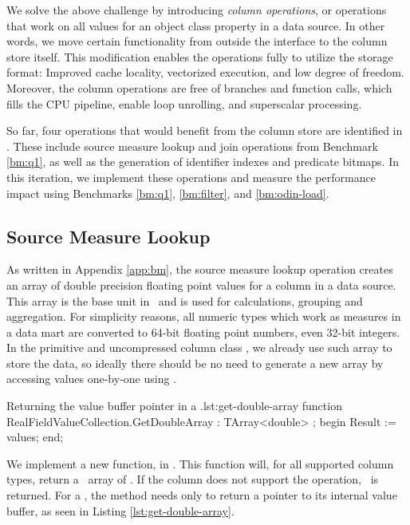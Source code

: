 We solve the above challenge by introducing \textit{column operations}, or operations that work on all values for an object class property in a data source. In other words, we move certain functionality from outside the  interface to the column store itself. This modification enables the operations fully to utilize the storage format: Improved cache locality, vectorized execution, and low degree of freedom. Moreover, the column operations are free of branches and function calls, which fills the CPU pipeline, enable loop unrolling, and superscalar processing.

So far, four operations that would benefit from the column store are identified in \gap. These include source measure lookup and join operations from Benchmark \ref{bm:q1}, as well as the generation of identifier indexes and predicate bitmaps. In this iteration, we implement these operations and measure the performance impact using Benchmarks \ref{bm:q1}, \ref{bm:filter}, and \ref{bm:odin-load}.





\subsection{Source Measure Lookup}
\label{sub:Source Measure Lookup}
As written in Appendix \ref{app:bm}, the source measure lookup operation creates an array of double precision floating point values for a column in a data source. This array is the base unit in \gd~and is used for calculations, grouping and aggregation. For simplicity reasons, all numeric types which work as measures in a data mart are converted to 64-bit floating point numbers, even 32-bit integers. In the primitive and uncompressed column class , we already use such array to store the data, so ideally there should be no need to generate a new array by accessing values one-by-one using .


\begin{delphicode}{Returning the value buffer pointer in a .}{lst:get-double-array}
function RealFieldValueCollection.GetDoubleArray
: TArray<double> ;
begin
  Result := values;
end;
\end{delphicode}
We implement a new function,  in . This function will, for all supported column types, return a \delphi~array of . If the column does not support the operation, \nil~is returned. For a , the method needs only to return a pointer to its internal value buffer, as seen in Listing \ref{lst:get-double-array}.

